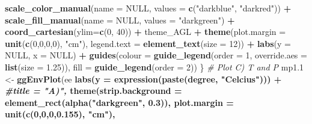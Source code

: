 \documentclass[
]{article}
\newenvironment{Shaded}{\begin{snugshade}}{\end{snugshade}}
\newcommand{\CommentTok}[1]{\textcolor[rgb]{0.56,0.35,0.01}{\textit{#1}}}
\newcommand{\DataTypeTok}[1]{\textcolor[rgb]{0.13,0.29,0.53}{#1}}
\newcommand{\DecValTok}[1]{\textcolor[rgb]{0.00,0.00,0.81}{#1}}
\newcommand{\FloatTok}[1]{\textcolor[rgb]{0.00,0.00,0.81}{#1}}
\newcommand{\KeywordTok}[1]{\textcolor[rgb]{0.13,0.29,0.53}{\textbf{#1}}}
\newcommand{\NormalTok}[1]{#1}
\newcommand{\OperatorTok}[1]{\textcolor[rgb]{0.81,0.36,0.00}{\textbf{#1}}}
\newcommand{\OtherTok}[1]{\textcolor[rgb]{0.56,0.35,0.01}{#1}}
\newcommand{\StringTok}[1]{\textcolor[rgb]{0.31,0.60,0.02}{#1}}
\begin{document}
\begin{Shaded}
\begin{Highlighting}[]
{{\StringTok{    }\KeywordTok{scale_color_manual}\NormalTok{(}\DataTypeTok{name =} \OtherTok{NULL}\NormalTok{, }\DataTypeTok{values =} \KeywordTok{c}\NormalTok{(}\StringTok{"darkblue"}\NormalTok{, }\StringTok{"darkred"}\NormalTok{)) }\OperatorTok{+}
\StringTok{    }\KeywordTok{scale_fill_manual}\NormalTok{(}\DataTypeTok{name =} \OtherTok{NULL}\NormalTok{, }\DataTypeTok{values =} \StringTok{"darkgreen"}\NormalTok{) }\OperatorTok{+}
\StringTok{    }\KeywordTok{coord_cartesian}\NormalTok{(}\DataTypeTok{ylim=}\KeywordTok{c}\NormalTok{(}\DecValTok{0}\NormalTok{, }\DecValTok{40}\NormalTok{)) }\OperatorTok{+}
\StringTok{    }\NormalTok{theme_AGL }\OperatorTok{+}\StringTok{ }
\StringTok{    }\KeywordTok{theme}\NormalTok{(}\DataTypeTok{plot.margin =} \KeywordTok{unit}\NormalTok{(}\KeywordTok{c}\NormalTok{(}\DecValTok{0}\NormalTok{,}\DecValTok{0}\NormalTok{,}\DecValTok{0}\NormalTok{,}\DecValTok{0}\NormalTok{), }\StringTok{"cm"}\NormalTok{),}
          \DataTypeTok{legend.text =} \KeywordTok{element_text}\NormalTok{(}\DataTypeTok{size =} \DecValTok{12}\NormalTok{)) }\OperatorTok{+}
\StringTok{    }\KeywordTok{labs}\NormalTok{(}\DataTypeTok{y =} \OtherTok{NULL}\NormalTok{, }\DataTypeTok{x =} \OtherTok{NULL}\NormalTok{) }\OperatorTok{+}
\StringTok{    }\KeywordTok{guides}\NormalTok{(}\DataTypeTok{colour =} \KeywordTok{guide_legend}\NormalTok{(}\DataTypeTok{order =} \DecValTok{1}\NormalTok{, }\DataTypeTok{override.aes =} \KeywordTok{list}\NormalTok{(}\DataTypeTok{size =} \FloatTok{1.25}\NormalTok{)), }
           \DataTypeTok{fill =} \KeywordTok{guide_legend}\NormalTok{(}\DataTypeTok{order =} \DecValTok{2}\NormalTok{))}
\NormalTok{\}}
\CommentTok{# Plot C) T and P}
\NormalTok{mp1}\FloatTok{.1}\NormalTok{ <-}\StringTok{ }\KeywordTok{ggEnvPlot}\NormalTok{(ee }\OperatorTok{%
\StringTok{  }\KeywordTok{labs}\NormalTok{(}\DataTypeTok{y =} \KeywordTok{expression}\NormalTok{(}\KeywordTok{paste}\NormalTok{(degree, }\StringTok{"Celcius"}\NormalTok{))) }\OperatorTok{+}\StringTok{ }\CommentTok{#title = "A)", }
\StringTok{  }\KeywordTok{theme}\NormalTok{(}\DataTypeTok{strip.background =} \KeywordTok{element_rect}\NormalTok{(}\KeywordTok{alpha}\NormalTok{(}\StringTok{"darkgreen"}\NormalTok{, }\FloatTok{0.3}\NormalTok{)),}
        \DataTypeTok{plot.margin =} \KeywordTok{unit}\NormalTok{(}\KeywordTok{c}\NormalTok{(}\DecValTok{0}\NormalTok{,}\DecValTok{0}\NormalTok{,}\DecValTok{0}\NormalTok{,}\FloatTok{0.155}\NormalTok{), }\StringTok{"cm"}\NormalTok{),}
}}}
\end{Highlighting}
\end{Shaded}
\end{document}
